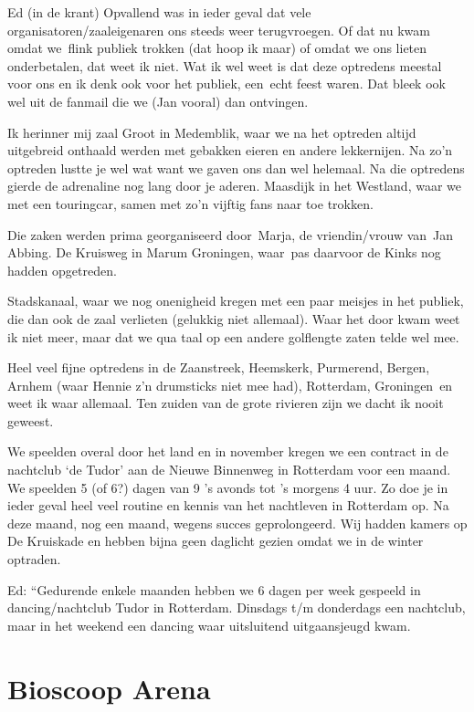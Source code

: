\documentclass[12pt,twoside]{memoir}
\begin{document}
Ed (in de krant) Opvallend was in ieder geval dat vele organisatoren/zaaleigenaren ons steeds weer terugvroegen. Of dat nu kwam omdat we flink publiek trokken (dat hoop ik maar) of omdat we ons lieten onderbetalen, dat weet ik niet. Wat ik wel weet is dat deze optredens meestal voor ons en ik denk ook voor het publiek, een echt feest waren. Dat bleek ook wel uit de fanmail die we (Jan vooral) dan ontvingen. 

Ik herinner mij zaal Groot in Medemblik, waar we na het optreden altijd uitgebreid onthaald werden met gebakken eieren en andere lekkernijen. Na zo'n optreden lustte je wel wat want we gaven ons dan wel helemaal. Na die optredens gierde de adrenaline nog lang door je aderen. Maasdijk in het Westland, waar we met een touringcar, samen met zo'n vijftig fans naar toe trokken. 

Die zaken werden prima georganiseerd door Marja, de vriendin/vrouw van Jan Abbing. De Kruisweg in Marum Groningen, waar pas daarvoor de Kinks nog hadden opgetreden.

Stadskanaal, waar we nog onenigheid kregen met een paar meisjes in het publiek, die dan ook de zaal verlieten (gelukkig niet allemaal). Waar het door kwam weet ik niet meer, maar dat we qua taal op een andere golflengte zaten telde wel mee. 

Heel veel fijne optredens in de Zaanstreek, Heemskerk, Purmerend, Bergen, Arnhem (waar Hennie z'n drumsticks niet mee had), Rotterdam, Groningen en weet ik waar allemaal. Ten zuiden van de grote rivieren zijn we dacht ik nooit geweest. 

We speelden overal door het land en in november kregen we een contract in de nachtclub ‘de Tudor’ aan de Nieuwe Binnenweg in Rotterdam voor een maand. We speelden 5 (of 6?) dagen van 9 ’s avonds tot ’s morgens 4 uur. Zo doe je in ieder geval heel veel routine en kennis van het nachtleven in Rotterdam op. Na deze maand, nog een maand, wegens succes geprolongeerd. Wij hadden kamers op De Kruiskade en hebben bijna geen daglicht gezien omdat we in de winter optraden. 

Ed: “Gedurende enkele maanden hebben we 6 dagen per week gespeeld in dancing/nachtclub Tudor in Rotterdam. Dinsdags t/m donderdags een nachtclub, maar in het weekend een dancing waar uitsluitend uitgaansjeugd kwam. 

\chapter{Bioscoop Arena} %
\label{cha:arena}
\end{document}
